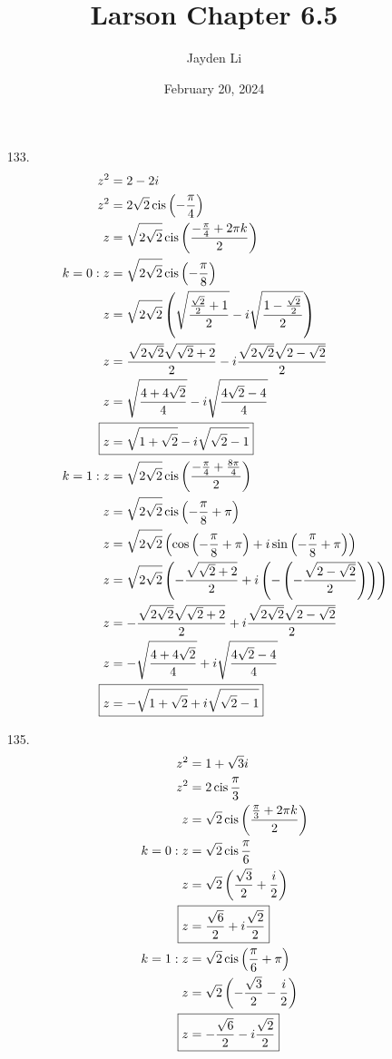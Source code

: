 \documentclass{article}
\title{Larson Chapter 6.5}
\author{Jayden Li}
\date{February 20, 2024}
\DeclareMathOperator{\cis}{cis}
\begin{document}
\setlength{\abovedisplayskip}{0pt}
\fontsize{12pt}{12pt}\selectfont
\allowdisplaybreaks
\maketitle

\begin{itemize}
\item[133.]
	\begin{align*}
		z^2&=2-2i \\
		z^2&=2\sqrt{2}\cis\left(-\frac{\pi}{4}\right) \\
		z&=\sqrt{2\sqrt{2}}\cis\left(\frac{-\frac{\pi}{4}+2\pi k}{2}\right) \\
		k=0:z&=\sqrt{2\sqrt{2}}\cis\left(-\frac{\pi}{8}\right) \\
		z&=\sqrt{2\sqrt{2}}\left(\sqrt{\frac{\frac{\sqrt{2}}{2}+1}{2}}-i\sqrt{\frac{1-\frac{\sqrt{2}}{2}}{2}}\right) \\
		z&=\frac{\sqrt{2\sqrt{2}}\sqrt{\sqrt{2}+2}}{2}-i\frac{\sqrt{2\sqrt{2}}\sqrt{2-\sqrt{2}}}{2} \\
		z&=\sqrt{\frac{4+4\sqrt{2}}{4}}-i\sqrt{\frac{4\sqrt{2}-4}{4}} \\
		\Aboxed{z&=\sqrt{1+\sqrt{2}}-i\sqrt{\sqrt{2}-1}}
		\\
		k=1:z&=\sqrt{2\sqrt{2}}\cis\left(\frac{-\frac{\pi}{4}+\frac{8\pi}{4}}{2}\right) \\
		z&=\sqrt{2\sqrt{2}}\cis\left(-\frac{\pi}{8}+\pi\right) \\
		z&=\sqrt{2\sqrt{2}}\left(\cos\left(-\frac{\pi}{8}+\pi\right)+i\sin\left(-\frac{\pi}{8}+\pi\right) \right) \\
		z&=\sqrt{2\sqrt{2}}\left(-\frac{\sqrt{\sqrt{2}+2}}{2}+i\left(-\left(-\frac{\sqrt{2-\sqrt{2}}}{2}\right)\right)\right) \\
		z&=-\frac{\sqrt{2\sqrt{2}}\sqrt{\sqrt{2}+2}}{2}+i\frac{\sqrt{2\sqrt{2}}\sqrt{2-\sqrt{2}}}{2} \\
		z&=-\sqrt{\frac{4+4\sqrt{2}}{4}}+i\sqrt{\frac{4\sqrt{2}-4}{4}} \\
		\Aboxed{z&=-\sqrt{1+\sqrt{2}}+i\sqrt{\sqrt{2}-1}}
	\end{align*}

\item[135.]
	\begin{align*}
		z^2&=1+\sqrt{3}i \\
		z^2&=2\cis\frac{\pi}{3} \\
		z&=\sqrt{2}\cis\left(\frac{\frac{\pi}{3}+2\pi k}{2}\right) \\
		k=0:z&=\sqrt{2}\cis\frac{\pi}{6} \\
		z&=\sqrt{2}\left(\frac{\sqrt{3}}{2}+\frac{i}{2}\right) \\
		\Aboxed{z&=\frac{\sqrt{6}}{2}+i\frac{\sqrt{2}}{2}} \\
		k=1:z&=\sqrt{2}\cis\left(\frac{\pi}{6}+\pi\right) \\
		z&=\sqrt{2}\left(-\frac{\sqrt{3}}{2}-\frac{i}{2}\right) \\
		\Aboxed{z&=-\frac{\sqrt{6}}{2}-i\frac{\sqrt{2}}{2}}
	\end{align*}


\end{itemize}
\end{document}
